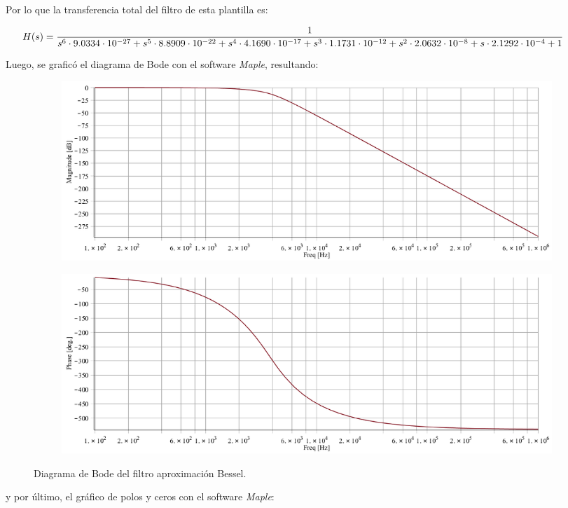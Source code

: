 Por lo que la transferencia total del filtro de esta plantilla es:

\begin{equation}
\hspace{-1cm}
H(s) = \frac{1}{s^6 \cdot 9.0334\cdot10^{-27}+s^5\cdot 8.8909\cdot10^{-22}+s^4\cdot 4.1690\cdot10^{-17}+s^3\cdot 1.1731\cdot10^{-12}+s^2\cdot 2.0632\cdot10^{-8}+s\cdot 2.1292\cdot10^{-4}+1}
\label{hsbesteo}
\end{equation}

Luego, se graficó el diagrama de Bode con el software \textit{Maple}, resultando:
\begin{figure}[H]
	\begin{subfigure}{\textwidth}
	\centering
	\includegraphics[width=\textwidth]{Imagenes-Ej1/bessel_hs.png}
	\end{subfigure}
	
	\begin{subfigure}{\textwidth}
	\centering
	\includegraphics[width=\textwidth]{Imagenes-Ej1/bessel_hspha.png}
	\end{subfigure}
	\label{fig:bodebes}
	\caption{Diagrama de Bode del filtro aproximación Bessel.}
\end{figure}
y por último, el gráfico de polos y ceros con el software \textit{Maple}:

